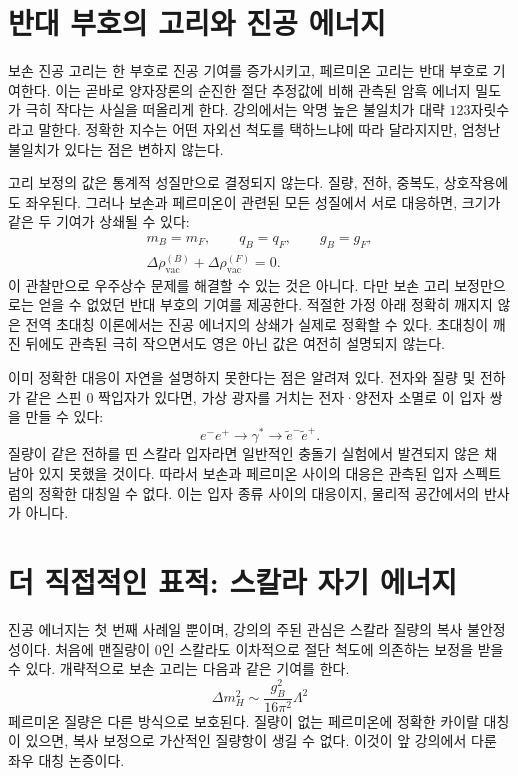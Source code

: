 \section{반대 부호의 고리와 진공 에너지}

보손 진공 고리는 한 부호로 진공 기여를 증가시키고, 페르미온 고리는 반대 부호로 기여한다. 이는 곧바로 양자장론의 순진한 절단 추정값에 비해 관측된 암흑 에너지 밀도가 극히 작다는 사실을 떠올리게 한다. 강의에서는 악명 높은 불일치가 대략 \(123\)자릿수라고 말한다. 정확한 지수는 어떤 자외선 척도를 택하느냐에 따라 달라지지만, 엄청난 불일치가 있다는 점은 변하지 않는다.

고리 보정의 값은 통계적 성질만으로 결정되지 않는다. 질량, 전하, 중복도, 상호작용에도 좌우된다. 그러나 보손과 페르미온이 관련된 모든 성질에서 서로 대응하면, 크기가 같은 두 기여가 상쇄될 수 있다:
\begin{equation}
\begin{gathered}
m_B=m_F,\qquad q_B=q_F,\qquad g_B=g_F,\\
\Delta\rho_{\mathrm{vac}}^{(B)}
+\Delta\rho_{\mathrm{vac}}^{(F)}=0.
\end{gathered}
\end{equation}
이 관찰만으로 우주상수 문제를 해결할 수 있는 것은 아니다. 다만 보손 고리 보정만으로는 얻을 수 없었던 반대 부호의 기여를 제공한다. 적절한 가정 아래 정확히 깨지지 않은 전역 초대칭 이론에서는 진공 에너지의 상쇄가 실제로 정확할 수 있다. 초대칭이 깨진 뒤에도 관측된 극히 작으면서도 영은 아닌 값은 여전히 설명되지 않는다.

이미 정확한 대응이 자연을 설명하지 못한다는 점은 알려져 있다. 전자와 질량 및 전하가 같은 스핀 0 짝입자가 있다면, 가상 광자를 거치는 전자·양전자 소멸로 이 입자 쌍을 만들 수 있다:
\begin{equation}
e^-e^+\longrightarrow\gamma^*
\longrightarrow\widetilde e^-\widetilde e^+.
\end{equation}
질량이 같은 전하를 띤 스칼라 입자라면 일반적인 충돌기 실험에서 발견되지 않은 채 남아 있지 못했을 것이다. 따라서 보손과 페르미온 사이의 대응은 관측된 입자 스펙트럼의 정확한 대칭일 수 없다. 이는 입자 종류 사이의 대응이지, 물리적 공간에서의 반사가 아니다.

\section{더 직접적인 표적: 스칼라 자기 에너지}

진공 에너지는 첫 번째 사례일 뿐이며, 강의의 주된 관심은 스칼라 질량의 복사 불안정성이다. 처음에 맨질량이 0인 스칼라도 이차적으로 절단 척도에 의존하는 보정을 받을 수 있다. 개략적으로 보손 고리는 다음과 같은 기여를 한다.
\begin{equation}
\Delta m_H^2\sim \frac{g_B^2}{16\pi^2}\Lambda^2
\end{equation}
페르미온 질량은 다른 방식으로 보호된다. 질량이 없는 페르미온에 정확한 카이랄 대칭이 있으면, 복사 보정으로 가산적인 질량항이 생길 수 없다. 이것이 앞 강의에서 다룬 좌우 대칭 논증이다.

